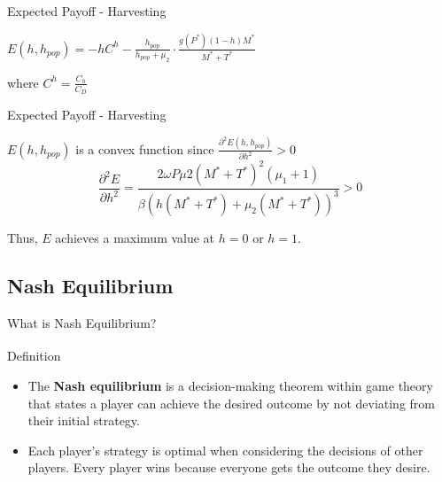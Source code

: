 \documentclass{beamer}
\begin{document}
\begin{frame}{Expected Payoff - Harvesting}
    \begin{center}
    $\displaystyle {E(h, h_{pop}) = -hC^{h} - \frac{h_{pop}}{h_{pop} + \mu_{2}} \cdot \frac{g(P^{*})(1-h)M^{*}}{M^{*} + T^{*}}}$ \\
    
    \vspace{0.6cm}
    
    where $C^{h} = \frac{C_{h}}{C_{D}}$
    \end{center}
\end{frame}

\begin{frame}{Expected Payoff - Harvesting}

$E(h, h_{pop})$ is a convex function since 
$\frac{\partial^{2}E(h, h_{pop})}{\partial h^{2}} > 0$ \\

$$\displaystyle {\frac{\partial ^ {2} E}{\partial h^{2}} = \frac{2 \omega P \mu{2} (M^{*}+T^{*})^{2} (\mu_{1} +1)}{\beta(h(M^{*}+T^{*}) + \mu_{2}(M^{*}+T^{*}))^{3}} > 0}$$
\vspace{0.6cm}

Thus, $E$ achieves a maximum value at $h = 0$ or $h=1$.

\end{frame}

\subsection{Nash Equilibrium}
\begin{frame}{What is Nash Equilibrium?}
    \begin{block}{Definition\textsuperscript{\cite{nash_definition}}}
        \begin{itemize}
            \item The \textbf{Nash equilibrium} is a decision-making theorem within game theory that states a player can achieve the desired outcome by not deviating from their initial strategy.
            \item Each player's strategy is optimal when considering the decisions of other players. Every player wins because everyone gets the outcome they desire.
        \end{itemize}
    \end{block}
\end{frame}
\end{document}
